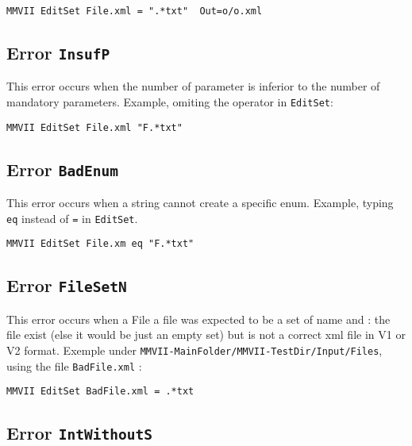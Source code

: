 \documentclass[a4paper]{book}
\newcommand{\MMVIDIR}{{\tt MMVII-MainFolder/}}
\begin{document}
\begin{verbatim}
MMVII EditSet File.xml = ".*txt"  Out=o/o.xml
\end{verbatim}

\subsection{Error {\tt InsufP}}

This error occurs when the number of parameter is inferior to the number
of mandatory parameters.  Example, omiting the operator in {\tt EditSet}:

\begin{verbatim}
MMVII EditSet File.xml "F.*txt"
\end{verbatim}


\subsection{Error {\tt BadEnum}}

This error occurs when a string cannot create a specific enum.
Example, typing {\tt eq} instead of {\tt =} in {\tt EditSet}.

\begin{verbatim}
MMVII EditSet File.xm eq "F.*txt"
\end{verbatim}



\subsection{Error {\tt FileSetN}}

This error occurs when a File a file was expected to be a set of name and : 
the file exist (else it would be just an empty set) but is not a correct
xml file in V1 or V2 format. Exemple under {\tt {\MMVIDIR}MMVII-TestDir/Input/Files},
using the file {\tt BadFile.xml} :

\begin{verbatim}
MMVII EditSet BadFile.xml = .*txt
\end{verbatim}


\subsection{Error {\tt IntWithoutS}}
\end{document}
